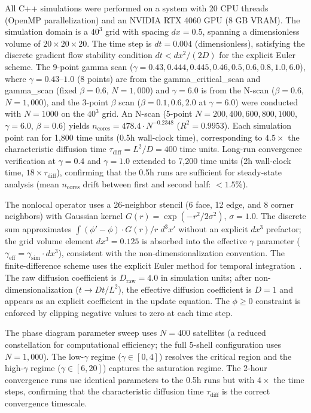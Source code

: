 \documentclass[sn-nature,pdflatex]{sn-jnl}
\begin{document}
All C++ simulations were performed on a system with 20 CPU threads (OpenMP parallelization) and an NVIDIA RTX 4060 GPU (8 GB VRAM). The simulation domain is a $40^3$ grid with spacing $dx = 0.5$, spanning a dimensionless volume of $20 \times 20 \times 20$. The time step is $dt = 0.004$ (dimensionless), satisfying the discrete gradient flow stability condition $dt < dx^2/(2D)$ for the explicit Euler scheme. The 9-point gamma scan ($\gamma = 0.43, 0.444, 0.445, 0.46, 0.5, 0.6, 0.8, 1.0, 6.0$), where $\gamma=0.43$--$1.0$ (8 points) are from the gamma\_critical\_scan and gamma\_scan (fixed $\beta=0.6$, $N=1,000$) and $\gamma=6.0$ is from the N-scan ($\beta=0.6$, $N=1,000$), and the 3-point $\beta$ scan ($\beta = 0.1, 0.6, 2.0$ at $\gamma=6.0$) were conducted with $N=1000$ on the $40^3$ grid. An N-scan (5-point $N=200, 400, 600, 800, 1000$, $\gamma=6.0$, $\beta=0.6$) yields $n_{\text{cores}} = 478.4 \cdot N^{-0.2348}$ ($R^2=0.9953$). Each simulation point ran for 1,800 time units (0.5h wall-clock time), corresponding to $4.5\times$ the characteristic diffusion time $\tau_{\text{diff}} = L^2/D = 400$ time units. Long-run convergence verification at $\gamma = 0.4$ and $\gamma = 1.0$ extended to 7,200 time units (2h wall-clock time, $18\times\tau_{\text{diff}}$), confirming that the 0.5h runs are sufficient for steady-state analysis (mean $n_{\text{cores}}$ drift between first and second half: $<1.5\%$).

The nonlocal operator uses a 26-neighbor stencil (6 face, 12 edge, and 8 corner neighbors) with Gaussian kernel $G(r) = \exp(-r^2/2\sigma^2)$, $\sigma = 1.0$. The discrete sum approximates $\int (\phi'-\phi)\cdot G(r)/r \; d^3x'$ without an explicit $dx^3$ prefactor; the grid volume element $dx^3 = 0.125$ is absorbed into the effective $\gamma$ parameter ($\gamma_{\text{eff}} = \gamma_{\text{sim}} \cdot dx^3$), consistent with the non-dimensionalization convention. The finite-difference scheme uses the explicit Euler method for temporal integration~\cite{leveque_2007}. The raw diffusion coefficient is $D_{\text{raw}} = 4.0$ in simulation units; after non-dimensionalization ($t \to D t / L^2$), the effective diffusion coefficient is $D = 1$ and appears as an explicit coefficient in the update equation. The $\phi \ge 0$ constraint is enforced by clipping negative values to zero at each time step.

The phase diagram parameter sweep uses $N = 400$ satellites (a reduced constellation for computational efficiency; the full 5-shell configuration uses $N = 1,000$). The low-$\gamma$ regime ($\gamma \in [0, 4]$) resolves the critical region and the high-$\gamma$ regime ($\gamma \in [6, 20]$) captures the saturation regime. The 2-hour convergence runs use identical parameters to the 0.5h runs but with $4\times$ the time steps, confirming that the characteristic diffusion time $\tau_{\text{diff}}$ is the correct convergence timescale.
\end{document}
